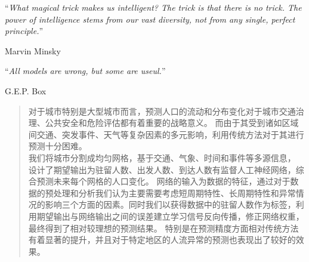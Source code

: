 \documentclass[
11pt, %
english, %
singlespacing, %
headsepline, %
]{MastersDoctoralThesis} %
\author{
 } %
\begin{document}
\frontmatter %

\pagestyle{plain} %





\cleardoublepage


\vspace*{0.2\textheight}

\noindent\enquote{\itshape What magical trick makes us intelligent? The trick is that there is no trick. The power of intelligence stems from our vast diversity, not from any single, perfect principle.}\bigbreak

\hfill Marvin Minsky

\vspace*{0.05\textheight}

\noindent\enquote{\itshape All models are wrong, but some are useul.}\bigbreak

\hfill G.E.P. Box


\begin{abstract}
\addchaptertocentry{\abstractname} %
对于城市特别是大型城市而言，预测人口的流动和分布变化对于城市交通治理、公共安全和危险评估都有着重要的战略意义。 而由于其受到诸如区域间交通、突发事件、天气等复杂因素的多元影响，利用传统方法对于其进行预测十分困难。\\ 
我们将城市分割成均匀网格，基于交通、气象、时间和事件等多源信息，
设计了期望输出为驻留人数、出发人数、到达人数有监督人工神经网络，综合预测未来每个网格的人口变化。 网络的输入为数据的特征，通过对于数据的预处理和分析我们认为主要需要考虑短周期特性、长周期特性和异常情况的影响三个方面的因素。同时我们以获得数据中的驻留人数作为标签，利用期望输出与网络输出之间的误差建立学习信号反向传播，修正网络权重，最终得到了相对较理想的预测结果。 特别是在预测精度方面相对传统方法有着显著的提升，并且对于特定地区的人流异常的预测也表现出了较好的效果。\\

\end{abstract}
\end{document}
